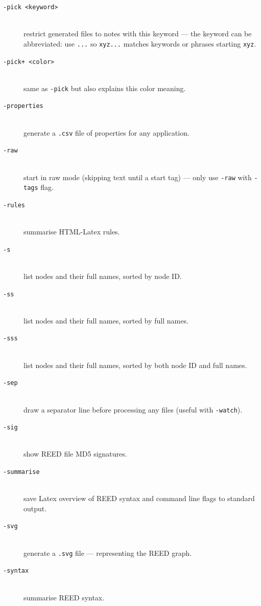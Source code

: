 \begin{description}
\item[\tt -pick <keyword>]~\\ restrict generated files to notes with this keyword --- the keyword can be abbreviated: use \texttt{...} so \texttt{xyz...} matches keywords or phrases starting \texttt{xyz}.

\item[\tt -pick+ <color>]~\\ same as \texttt{-pick} but also explains this color meaning.

\item[\tt -properties]~\\ generate a \texttt{.csv} file of properties for any application.

\item[\tt -raw]~\\ start in raw mode (skipping text until a start tag) --- only use \texttt{-raw} with \texttt{-tags} flag.

\item[\tt -rules]~\\ summarise HTML-Latex rules.

\item[\tt -s]~\\ list nodes and their full names, sorted by node ID.

\item[\tt -ss]~\\ list nodes and their full names, sorted by full names.

\item[\tt -sss]~\\ list nodes and their full names, sorted by both node ID and full names.

\item[\tt -sep]~\\ draw a separator line before processing any files (useful with \texttt{-watch}).

\item[\tt -sig]~\\ show REED file MD5 signatures.

\item[\tt -summarise]~\\ save Latex overview of REED syntax and command line flags to standard output.

\item[\tt -svg]~\\ generate a \texttt{.svg} file --- representing the REED graph.

\item[\tt -syntax]~\\ summarise REED syntax.


\end{description}
